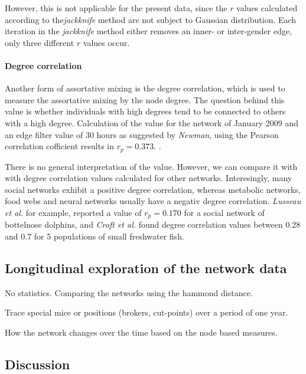 However, this is not applicable for the present data, since the $r$ values calculated according to the\textit{jackknife} method are not subject to Gaussian distribution. Each iteration in the \textit{jackknife} method either removes an inner- or inter-gender edge, only three different $r$ values occur.

\paragraph{Degree correlation}
 
Another form of assortative mixing is the degree correlation, which is used to measure the assortative mixing by the node degree. The question behind this value is whether individuals with high degrees tend to be connected to others with a high degree\cite{croft:07}. Calculation of the value for the network of January 2009 and an edge filter value of 30 hours as suggested by \textit{Newman}\cite{newman:02}, using the Pearson correlation cofficient results in $r_p = 0.373$. \cite{newman:03a}. 

There is no general interpretation of the value. However, we can compare it with with degree correlation values calculated for other networks. Interesingly, many social networks exhibit a positive degree correlation, whereas metabolic networks, food webs and neural networks usually have a negativ degree correlation\cite{newman:03a}. \textit{Lusseau et al.}\cite{lusseau:06} for example, reported a value of $r_p = 0.170$ for a social network of bottelnose dolphins, and \textit{Croft et al.}\cite{croft:05} found degree correlation values between $0.28$ and $0.7$ for 5 populations of small freshwater fish.   
 
\subsection{Longitudinal exploration of the network data}
\label{subsec:longitudinal}
No statistics.
Comparing the networks using the hammond distance.

\begin{mylist}
\item Trace special mice or positions (brokers, cut-points) over a period of one year.
\item How the network changes over the time based on the node based measures.
\end{mylist} 

\subsection{Discussion}
\label{subsec:discussion}



